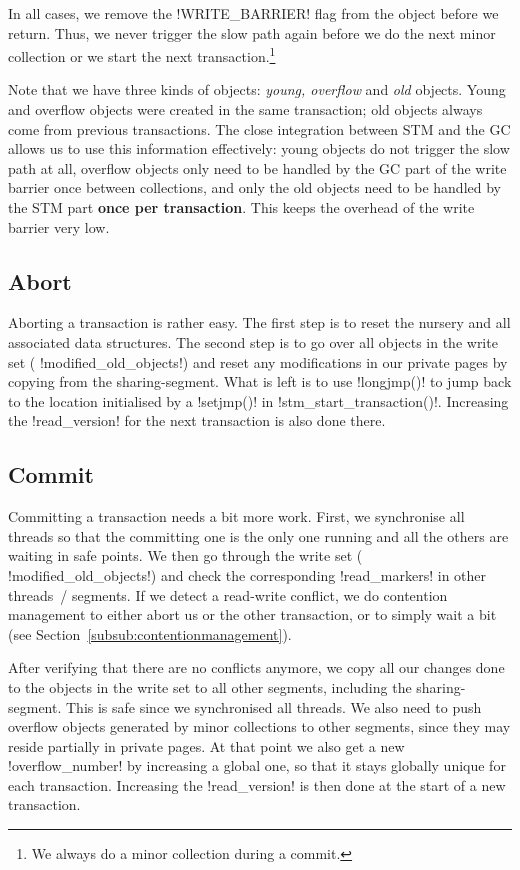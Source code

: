 \documentclass{sigplanconf}
\makeatletter
\renewcommand\lstinline[1][]{%
  \Collectverb{\@@myverb}%
}
\def\@@myverb#1{%
    \begingroup
    \fboxsep=0.2em
    \colorbox{verylightgray}{\oldlstinline|#1|}%
    \endgroup
}
\makeatother
\begin{document}
In all cases, we remove the \lstinline!WRITE_BARRIER!  flag from the
object before we return. Thus, we never trigger the slow path again
before we do the next minor collection or we start the next
transaction.\footnote{We always do a minor collection during a commit.}

Note that we have three kinds of objects: \emph{young, overflow} and
\emph{old} objects. Young and overflow objects were created in the
same transaction; old objects always come from previous transactions.
The close integration between STM and the GC allows us to use this
information effectively: young objects do not trigger the slow path at
all, overflow objects only need to be handled by the GC part of the
write barrier once between collections, and only the old objects need
to be handled by the STM part \textbf{once per transaction}. This keeps the
overhead of the write barrier very low.


\subsection{Abort}

Aborting a transaction is rather easy. The first step is to reset the
nursery and all associated data structures. The second step is to go
over all objects in the write set (\lstinline!modified_old_objects!)
and reset any modifications in our private pages by copying from the
sharing-segment. What is left is to use \lstinline!longjmp()!  to jump
back to the location initialised by a \lstinline!setjmp()!  in
\lstinline!stm_start_transaction()!.  Increasing the
\lstinline!read_version! for the next transaction is also done there.




\subsection{Commit}

Committing a transaction needs a bit more work. First, we synchronise
all threads so that the committing one is the only one running and all
the others are waiting in safe points. We then go through the write
set (\lstinline!modified_old_objects!)  and check the corresponding
\lstinline!read_markers!  in other threads~/ segments. If we detect a
read-write conflict, we do contention management to either abort us or
the other transaction, or to simply wait a bit (see Section~\ref{subsub:contentionmanagement}).

After verifying that there are no conflicts anymore, we copy all our
changes done to the objects in the write set to all other segments,
including the sharing-segment. This is safe since we synchronised all
threads. We also need to push overflow objects generated by minor
collections to other segments, since they may reside partially in
private pages. At that point we also get a new
\lstinline!overflow_number! by increasing a global one, so that it
stays globally unique for each transaction. Increasing the
\lstinline!read_version!  is then done at the start of a new
transaction.
\end{document}
